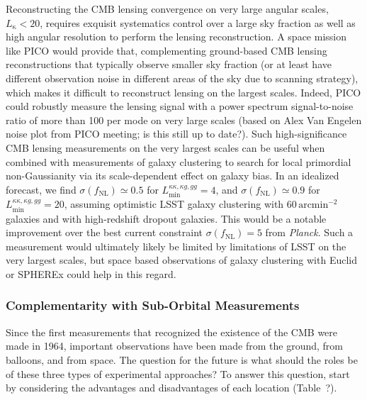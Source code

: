 \documentclass[PICOReport.tex]{subfiles}
\begin{document}
Reconstructing the CMB lensing convergence on very large angular scales, $L_\mathrm{\kappa}<20$, requires exquisit systematics control over a large sky fraction as well as high angular resolution to perform the lensing reconstruction. 
A space mission like PICO would provide that, complementing ground-based CMB lensing reconstructions that typically observe smaller sky fraction (or at least have different observation noise in different areas of the sky due to scanning strategy), which makes it difficult to reconstruct lensing on the largest scales. 
Indeed,  PICO could robustly measure the lensing signal with a power spectrum signal-to-noise ratio of more than 100 per mode on very large scales (based on Alex Van Engelen noise plot from PICO meeting; is this still up to date?).
Such high-significance CMB lensing measurements on the very largest scales can be useful when combined with measurements of  galaxy clustering to search for local primordial non-Gaussianity via its scale-dependent effect on galaxy bias.
In an idealized forecast, we find $\sigma(f_\mathrm{NL})\simeq 0.5$ for $L_\mathrm{min}^{\kappa\kappa,\kappa g,gg}=4$, and $\sigma(f_\mathrm{NL})\simeq 0.9$ for $L_\mathrm{min}^{\kappa\kappa,\kappa g,gg}=20$, assuming optimistic LSST galaxy clustering with $60\,\mathrm{arcmin}^{-2}$ galaxies and with high-redshift dropout galaxies.
This would be a notable improvement over the best current constraint $\sigma(f_\mathrm{NL})=5$ from {\it Planck}.
Such a measurement would ultimately likely be limited by limitations of LSST on the very largest scales, but space based observations of galaxy clustering with Euclid or SPHEREx could help in this regard.


\subsubsection{Complementarity with Sub-Orbital Measurements}


Since the first measurements that recognized the existence of the CMB were made in 1964, important observations have been made from the ground, from balloons, and from space.  The question for the future is what should the roles be of these three types of experimental approaches?  To answer this question, start by considering the advantages and disadvantages of each location (Table~?).
\end{document}
